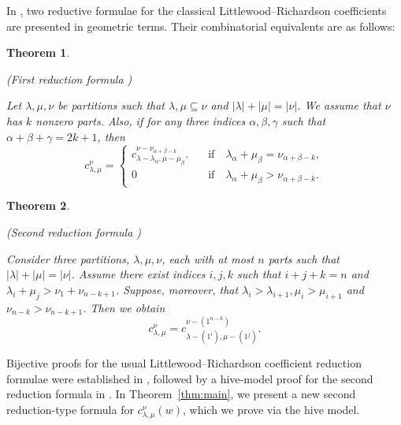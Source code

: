 \documentclass[11pt,reqno]{amsart}
\newtheorem{theorem}{Theorem}
\begin{document}
In \cite{Hive-main}, two reductive formulae for the classical Littlewood--Richardson coeﬃcients are presented in geometric terms. Their combinatorial equivalents are as follows:
\begin{theorem}
\begin{upshape}
    (First reduction formula \cite[Theorem 2.1]{Hive-JCTA})
\end{upshape}
   Let $\lambda,\mu,\nu $ be partitions such that $\lambda,\mu \subseteq \nu$ and $|\lambda|+|\mu|=|\nu|$. We assume that $\nu$ has $k$ nonzero parts. Also, if for any three indices $\alpha,\beta,\gamma$ such that $\alpha +\beta + \gamma =2k+1$, then 
   \begin{equation*}
 c^{\nu}_{\lambda,\mu} = \left\{ 
    \begin{array}{ll}
     c^{\nu-\nu_{\alpha+\beta-k}}_{\lambda-\lambda_{\alpha},\mu-\mu_{\beta}}.
         & \quad \text{if} \quad \lambda_{\alpha}+\mu_{\beta}=\nu_{\alpha+\beta-k},  \\
        0 & \quad \text{if} \quad \lambda_{\alpha}+\mu_{\beta} > \nu_{\alpha+\beta-k}. 
    \end{array}  \right. 
\end{equation*}
\end{theorem}
\begin{theorem}\begin{upshape}
    (Second reduction formula \cite[Theorem 2.3]{Hive-reduction})
\end{upshape}
\label{thm:second}
   Consider three partitions, $\lambda,\mu,\nu $, each with at most $n$ parts such that $|\lambda|+|\mu|=|\nu|$. Assume there exist indices $i,j,k$ such that $i+j+k=n$ and $\lambda_i+\mu_j>\nu_1 +\nu_{n-k+1}$. Suppose, moreover, that $\lambda_i >\lambda_{i+1}, \mu_i >\mu_{i+1}$ and $\nu_{n-k}>\nu_{n-k+1}$. Then we obtain 
   $$ c^{\nu}_{\lambda,\mu} = c^{\nu-(1^{n-k})}_{\lambda-(1^i),\mu-(1^j)}.$$
\end{theorem}
Bijective proofs for the usual Littlewood--Richardson coefficient reduction formulae were established in \cite{Hive-JCTA,Hive-Korean}, followed by a hive-model proof for the second reduction formula in \cite{Hive-reduction}. In Theorem~\ref{thm:main}, we present a new second reduction-type formula for $c^{\nu}_{\lambda,\mu}(w)$, which we prove via the hive model.
\end{document}
